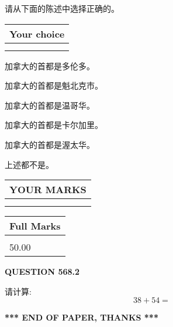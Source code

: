 \documentclass{ctexart}
\begin{document}
  
请从下面的陈述中选择正确的。
  
  
\noindent\hspace{3.0in} \begin{tabular}{|l|}
\hline
Your choice \\
\hline
 \\ 
 \\ 
\hline
\end{tabular}
  
  
 
 
加拿大的首都是多伦多。
 
 
加拿大的首都是魁北克市。
 
 
加拿大的首都是温哥华。
 
 
加拿大的首都是卡尔加里。
 
 
加拿大的首都是渥太华。
 
 
 上述都不是。
 
 
  
\vspace{0.2in}
  
\noindent\begin{tabular}{|l|}
\hline
 YOUR MARKS  \\
\hline
 \\ 
 \\ 
\hline
\end{tabular}
\hspace{0.05in} \begin{tabular}{|l|}
\hline
 Full Marks  \\
\hline
 \\ 
50.00 \\
\hline
\end{tabular}
{\textbf{\Large{QUESTION
568.2 
}}}
  
  
 
请计算:
\begin{equation}
38 +  %
54 = \nonumber
\end{equation}
 

 

 
   
   
 \vspace{0.2in}
 
   
   
   
   
\vspace{1.0in} 
{\textbf{\large{ *** END OF PAPER, THANKS *** }}} 
   
\end{document}
